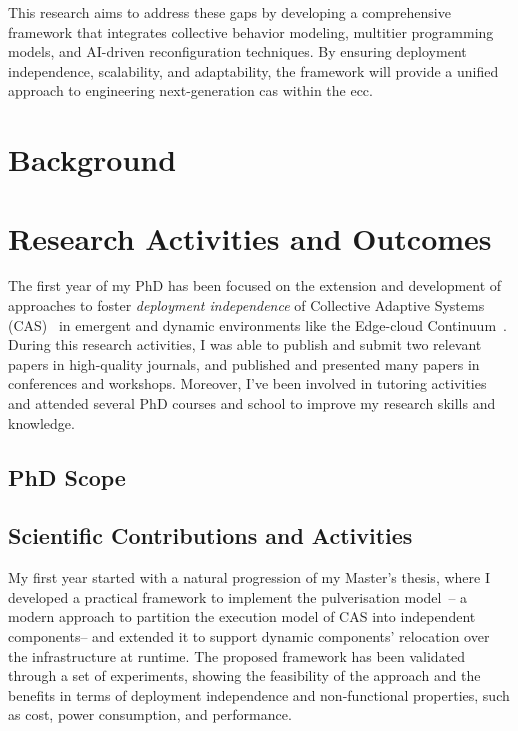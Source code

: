 \documentclass[runningheads]{llncs}
\begin{document}
This research aims to address these gaps by developing a comprehensive framework that integrates collective behavior modeling,
multitier programming models,
and AI-driven reconfiguration techniques.
%
By ensuring deployment independence,
scalability,
and adaptability,
the framework will provide a unified approach to engineering next-generation \ac{cas} within the \ac{ecc}.

\section{Background}
\label{sec:background}

\section{Research Activities and Outcomes}
\label{sec:research-activities}

The first year of my PhD has been focused on the extension and development of approaches to foster \emph{deployment independence} of Collective Adaptive Systems (CAS)~\cite{DBLP:conf/birthday/BucchiaroneM19} in emergent and dynamic environments like the Edge-cloud Continuum~\cite{DBLP:journals/access/MoreschiniPLNHT22}.
%
During this research activities,
I was able to publish and submit two relevant papers in high-quality journals,
and published and presented many papers in conferences and workshops.
%
Moreover,
I've been involved in tutoring activities and attended several PhD courses and school to improve my research skills and knowledge.

\subsection{PhD Scope}

\subsection{Scientific Contributions and Activities}

My first year started with a natural progression of my Master's thesis,
where I developed a practical framework to implement the pulverisation model~\cite{DBLP:journals/fi/CasadeiPPVW20,DBLP:journals/iotj/CasadeiFPPSV22}--
a modern approach to partition the execution model of CAS into independent components--
and extended it to support dynamic components' relocation over the infrastructure at runtime.
%
The proposed framework has been validated through a set of experiments,
showing the feasibility of the approach and the benefits in terms of deployment independence and non-functional properties,
such as cost,
power consumption,
and performance.
\end{document}
